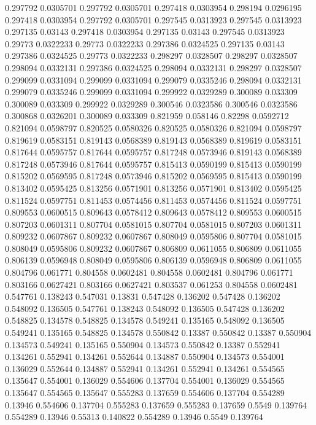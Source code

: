 0.297792 0.0305701
0.297792 0.0305701
0.297418 0.0303954
0.298194 0.0296195
0.297418 0.0303954
0.297792 0.0305701
0.297545 0.0313923
0.297545 0.0313923
0.297135 0.03143
0.297418 0.0303954
0.297135 0.03143
0.297545 0.0313923
0.29773 0.0322233
0.29773 0.0322233
0.297386 0.0324525
0.297135 0.03143
0.297386 0.0324525
0.29773 0.0322233
0.298297 0.0328507
0.298297 0.0328507
0.298094 0.0332131
0.297386 0.0324525
0.298094 0.0332131
0.298297 0.0328507
0.299099 0.0331094
0.299099 0.0331094
0.299079 0.0335246
0.298094 0.0332131
0.299079 0.0335246
0.299099 0.0331094
0.299922 0.0329289
0.300089 0.033309
0.300089 0.033309
0.299922 0.0329289
0.300546 0.0323586
0.300546 0.0323586
0.300868 0.0326201
0.300089 0.033309
0.821959 0.058146
0.82298 0.0592712
0.821094 0.0598797
0.820525 0.0580326
0.820525 0.0580326
0.821094 0.0598797
0.819619 0.0583151
0.819143 0.0568389
0.819143 0.0568389
0.819619 0.0583151
0.817644 0.0595757
0.817644 0.0595757
0.817248 0.0573946
0.819143 0.0568389
0.817248 0.0573946
0.817644 0.0595757
0.815413 0.0590199
0.815413 0.0590199
0.815202 0.0569595
0.817248 0.0573946
0.815202 0.0569595
0.815413 0.0590199
0.813402 0.0595425
0.813256 0.0571901
0.813256 0.0571901
0.813402 0.0595425
0.811524 0.0597751
0.811453 0.0574456
0.811453 0.0574456
0.811524 0.0597751
0.809553 0.0600515
0.809643 0.0578412
0.809643 0.0578412
0.809553 0.0600515
0.807203 0.0601311
0.807704 0.0581015
0.807704 0.0581015
0.807203 0.0601311
0.809232 0.0607867
0.809232 0.0607867
0.808049 0.0595806
0.807704 0.0581015
0.808049 0.0595806
0.809232 0.0607867
0.806809 0.0611055
0.806809 0.0611055
0.806139 0.0596948
0.808049 0.0595806
0.806139 0.0596948
0.806809 0.0611055
0.804796 0.061771
0.804558 0.0602481
0.804558 0.0602481
0.804796 0.061771
0.803166 0.0627421
0.803166 0.0627421
0.803537 0.061253
0.804558 0.0602481
0.547761 0.138243
0.547031 0.13831
0.547428 0.136202
0.547428 0.136202
0.548092 0.136505
0.547761 0.138243
0.548092 0.136505
0.547428 0.136202
0.548825 0.134578
0.548825 0.134578
0.549241 0.135165
0.548092 0.136505
0.549241 0.135165
0.548825 0.134578
0.550842 0.13387
0.550842 0.13387
0.550904 0.134573
0.549241 0.135165
0.550904 0.134573
0.550842 0.13387
0.552941 0.134261
0.552941 0.134261
0.552644 0.134887
0.550904 0.134573
0.554001 0.136029
0.552644 0.134887
0.552941 0.134261
0.552941 0.134261
0.554565 0.135647
0.554001 0.136029
0.554606 0.137704
0.554001 0.136029
0.554565 0.135647
0.554565 0.135647
0.555283 0.137659
0.554606 0.137704
0.554289 0.13946
0.554606 0.137704
0.555283 0.137659
0.555283 0.137659
0.5549 0.139764
0.554289 0.13946
0.55313 0.140822
0.554289 0.13946
0.5549 0.139764
